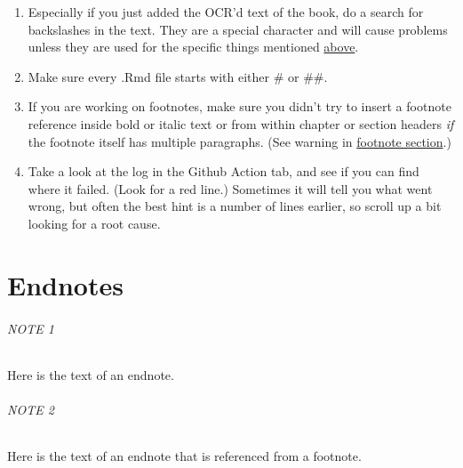 \documentclass[
]{book}
\providecommand{\tightlist}{%
  \setlength{\itemsep}{0pt}\setlength{\parskip}{0pt}}
\begin{document}
\begin{enumerate}
\def\labelenumi{\arabic{enumi}.}
\tightlist
\item
  Especially if you just added the OCR'd text of the book, do a search for backslashes in the text. They are a special character and will cause problems unless they are used for the specific things mentioned \protect\hyperlink{backslashes}{above}.
\item
  Make sure every .Rmd file starts with either \# or \#\#.
\item
  If you are working on footnotes, make sure you didn't try to insert a footnote reference inside bold or italic text or from within chapter or section headers \emph{if} the footnote itself has multiple paragraphs. (See warning in \protect\hyperlink{footnotes}{footnote section}.)
\item
  Take a look at the log in the Github Action tab, and see if you can find where it failed. (Look for a red line.) Sometimes it will tell you what went wrong, but often the best hint is a number of lines earlier, so scroll up a bit looking for a root cause.
\end{enumerate}

\hypertarget{endnotes-1}{%
\chapter*{Endnotes}\label{endnotes-1}}

\hypertarget{en.01}{%
\subparagraph*{NOTE 1}\label{en.01}}

Here is the text of an endnote.

\hypertarget{en.02}{%
\subparagraph*{NOTE 2}\label{en.02}}

Here is the text of an endnote that is referenced from a footnote.
\end{document}

